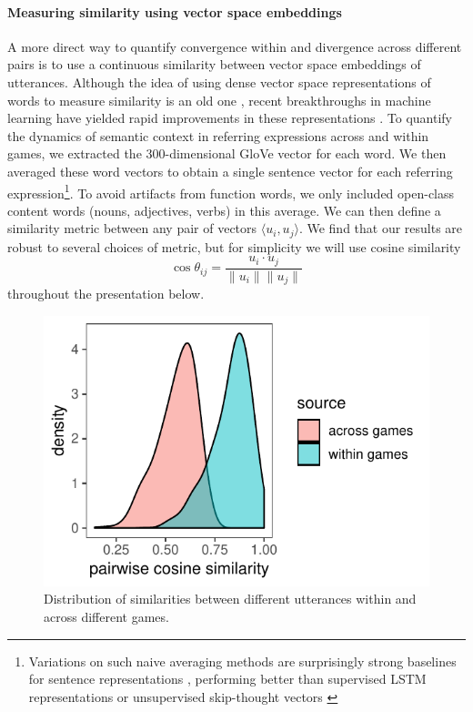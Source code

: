 \documentclass[alpha-refs]{wiley-article}
\begin{document}
\paragraph{Measuring similarity using vector space embeddings} 
A more direct way to quantify convergence within and divergence across different pairs is to use a continuous similarity between vector space embeddings of utterances.
Although the idea of using dense vector space representations of words to measure similarity is an old one \citep{osgood1952nature,landauer_solution_1997,bengio_neural_2003}, recent breakthroughs in machine learning have yielded rapid improvements in these representations \citep[e.g.][]{mikolov2013distributed,pennington2014glove}.
To quantify the dynamics of semantic context in referring expressions across and within games, we extracted the 300-dimensional GloVe vector for each word. 
We then averaged these word vectors to obtain a single sentence vector for each referring expression\footnote{Variations on such naive averaging methods are surprisingly strong baselines for sentence representations \citep{arora2017asimple}, performing better than supervised LSTM representations or unsupervised skip-thought vectors \citep{KirosEtAl15_SkipThought}}.
To avoid artifacts from function words, we only included open-class content words (nouns, adjectives, verbs) in this average.
We can then define a similarity metric between any pair of vectors $\langle u_i, u_j \rangle$.
We find that our results are robust to several choices of metric, but for simplicity we will use cosine similarity $$\cos \theta_{ij} = \frac{u_i \cdot u_j}{\| u_i\| \| u_j \|}$$ throughout the presentation below.

\begin{figure}[t!]
\centering
\includegraphics[scale=.9]{across_vs_within.pdf}
\caption{Distribution of similarities between different utterances within and across different games.}
\label{fig:withinvsacross}
\end{figure}
\end{document}
